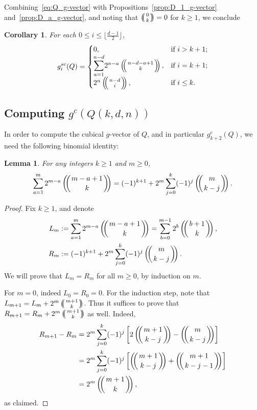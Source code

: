 \documentclass[a4paper,leqno]{article}
\newtheorem{lemma}[theorem]{Lemma}
\newtheorem{corollary}[theorem]{Corollary}
\theoremstyle{definition}
\newcommand{\gc}{g^c}
\newcommand{\gsc}{g^{sc}}
\def\mchoose#1#2{\ensuremath{\left(\kern-.3em\left(\genfrac{}{}{0pt}{}{#1}{#2}\right)\kern-.3em\right)}}
\begin{document}
Combining~\eqref{eq:Q_g-vector} with Propositions~\ref{prop:D_1_g-vector} and~\ref{prop:D_a_g-vector},
and noting that $\mchoose{0}{k} = 0$ for $k \ge 1$,
we conclude
\begin{corollary}\label{t:gsc_Q}
For each $0 \leq i \leq \lfloor \frac{d-1}{2} \rfloor$,
\[
\gsc_i(Q)=\begin{cases}
0,& \text{if } i>k+1;\\
{\displaystyle \sum_{a=1}^{n-d}} 2^{n-a} \mchoose{n-d-a+1}{k}
,& \text{if } i=k+1;\\
2^n \mchoose{n-d}{i},& \text{if } i\leq k.
\end{cases}
\]
\end{corollary}

\subsection{Computing $\gc(Q(k,d,n))$}

In order to compute the cubical $g$-vector of $Q$, and in particular $\gc_{k+2}(Q)$, we need the following binomial identity:
\begin{lemma}\label{t:binomial}
For any integers $k \ge 1$ and $m \ge 0$,
\[
\sum_{a=1}^{m} 2^{m-a} \mchoose{m-a+1}{k}
= (-1)^{k+1} + 2^m \sum_{j=0}^{k} (-1)^j \mchoose{m}{k-j}.
\]
\end{lemma}
\begin{proof}
Fix $k \ge 1$, and denote
\[
\begin{aligned}
L_m &:= \sum_{a=1}^{m} 2^{m-a} \mchoose{m-a+1}{k}
= \sum_{b=0}^{m-1} 2^{b} \mchoose{b+1}{k}, \\
R_m &:= (-1)^{k+1} + 2^m \sum_{j=0}^{k} (-1)^j \mchoose{m}{k-j}.
\end{aligned}
\]
We will prove that $L_m = R_m$ for all $m \ge 0$, by induction on $m$.

For $m=0$, indeed $L_0 = R_0 = 0$.
For the induction step, note that
$L_{m+1} = L_m + 2^m \mchoose{m+1}{k}$.
Thus it suffices to prove that
$R_{m+1} = R_m + 2^m \mchoose{m+1}{k}$ as well. Indeed,
\begin{equation*}
\begin{aligned}
R_{m+1} - R_m
&= 2^m \sum_{j=0}^{k} (-1)^j \left[ 2\mchoose{m+1}{k-j} - \mchoose{m}{k-j} \right] \\
&= 2^m \sum_{j=0}^{k} (-1)^j \left[ \mchoose{m+1}{k-j} + \mchoose{m+1}{k-j-1} \right] \\
&= 2^m \mchoose{m+1}{k},
\end{aligned}
\end{equation*}
as claimed.
\end{proof}
\end{document}
